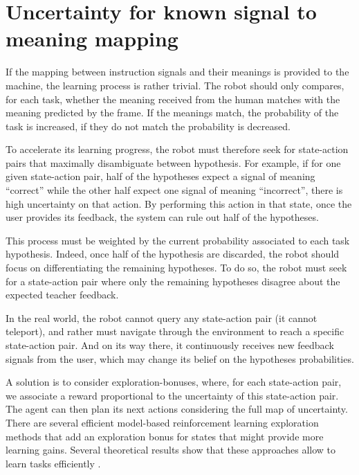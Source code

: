 \section{Uncertainty for known signal to meaning mapping}


If the mapping between instruction signals and their meanings is provided to the machine, the learning process is rather trivial. The robot should only compares, for each task, whether the meaning received from the human matches with the meaning predicted by the frame. If the meanings match, the probability of the task is increased, if they do not match the probability is decreased.

To accelerate its learning progress, the robot must therefore seek for state-action pairs that maximally disambiguate between hypothesis. For example, if for one given state-action pair, half of the hypotheses expect a signal of meaning ``correct'' while the other half expect one signal of meaning ``incorrect'', there is high uncertainty on that action. By performing this action in that state, once the user provides its feedback, the system can rule out half of the hypotheses.

This process must be weighted by the current probability associated to each task hypothesis. Indeed, once half of the hypothesis are discarded, the robot should focus on differentiating the remaining hypotheses. To do so, the robot must seek for a state-action pair where only the remaining hypotheses disagree about the expected teacher feedback.

In the real world, the robot cannot query any state-action pair (it cannot teleport), and rather must navigate through the environment to reach a specific state-action pair. And on its way there, it continuously receives new feedback signals from the user, which may change its belief on the hypotheses probabilities.

A solution is to consider exploration-bonuses, where, for each state-action pair, we associate a reward proportional to the uncertainty of this state-action pair. The agent can then plan its next actions considering the full map of uncertainty. There are several efficient model-based reinforcement learning exploration methods that add an exploration bonus for states that might provide more learning gains. Several theoretical results show that these approaches allow to learn tasks efficiently \cite{brafman2003r,kolter2009near}.

